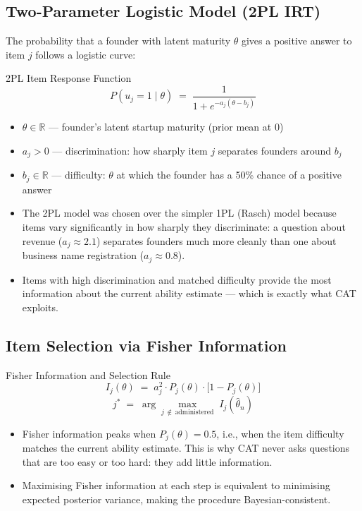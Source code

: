 \documentclass[11pt,a4paper]{article}
\begin{document}
\subsection{Two-Parameter Logistic Model (2PL IRT)}

The probability that a founder with latent maturity $\theta$ gives a positive answer to
item $j$ follows a logistic curve:

\begin{mathbox}{2PL Item Response Function}
\[
  P(u_j = 1 \mid \theta) \;=\; \frac{1}{1 + e^{-a_j(\theta - b_j)}}
\]
\begin{itemize}
  \item $\theta \in \mathbb{R}$ — founder's latent startup maturity (prior mean at $0$)
  \item $a_j > 0$ — discrimination: how sharply item $j$ separates founders around $b_j$
  \item $b_j \in \mathbb{R}$ — difficulty: $\theta$ at which the founder has a 50\% chance
        of a positive answer
\end{itemize}
\end{mathbox}

\begin{itemize}
  \item The 2PL model was chosen over the simpler 1PL (Rasch) model because items vary
        significantly in how sharply they discriminate: a question about revenue
        ($a_j \approx 2.1$) separates founders much more cleanly than one about business
        name registration ($a_j \approx 0.8$).
  \item Items with high discrimination and matched difficulty provide the most information
        about the current ability estimate — which is exactly what CAT exploits.
\end{itemize}

\subsection{Item Selection via Fisher Information}

\begin{mathbox}{Fisher Information and Selection Rule}
\[
  I_j(\theta) \;=\; a_j^2 \cdot P_j(\theta) \cdot \bigl[1 - P_j(\theta)\bigr]
\]
\[
  j^* \;=\; \arg\max_{j \,\notin\, \text{administered}}\; I_j(\hat{\theta}_n)
\]
\end{mathbox}

\begin{itemize}
  \item Fisher information peaks when $P_j(\theta) = 0.5$, i.e., when the item difficulty
        matches the current ability estimate. This is why CAT never asks questions that are
        too easy or too hard: they add little information.
  \item Maximising Fisher information at each step is equivalent to minimising expected
        posterior variance, making the procedure Bayesian-consistent.
\end{itemize}
\end{document}
